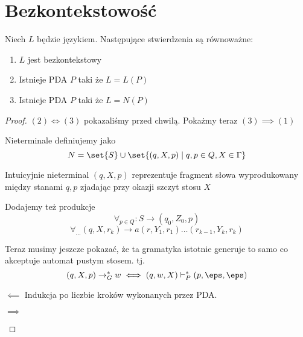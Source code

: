 \section{Bezkontekstowość}

\begin{theorem}
    Niech \( L \) będzie językiem. Następujące stwierdzenia są równoważne:
    \begin{enumerate}
        \item \( L \) jest bezkontekstowy
        \item Istnieje PDA \( P \) taki że \( L = L(P) \)
        \item Istnieje PDA \( P \) taki że \( L = N(P) \)
    \end{enumerate}
\end{theorem}
\begin{proof}
\( (2) \iff (3) \) pokazaliśmy przed chwilą. Pokażmy teraz \( (3) \implies (1) \)

Nieterminale definiujemy jako
\[
    N = \set{S} \cup \set{(q, X, p) \mid q, p \in Q, X \in \Gamma }
\]

Intuicyjnie nieterminal \( (q, X, p) \) reprezentuje fragment słowa wyprodukowany między stanami \( q, p \) zjadając przy okazji szczyt stosu \( X \)

Dodajemy też produkcje
\[
    \forall_{p \in Q} : S \rightarrow (q_0, Z_0, p)
\]
\[
    \forall_{\dots} (q, X, r_k) \rightarrow a (r, Y_1, r_1) \dots ( r_{k-1}, Y_k, {r_k}) 
\]

Teraz musimy jeszcze pokazać, że ta gramatyka istotnie generuje to samo co akceptuje automat pustym stosem. tj.
\[
    (q, X, p) \rightarrow_G^* w \iff (q, w, X) \vdash_P^* (p, \eps, \eps) 
\]
\begin{description}
    \item \( \impliedby \)
        Indukcja po liczbie kroków wykonanych przez PDA.
    
    
    \item \( \implies \)
\end{description}

\end{proof}